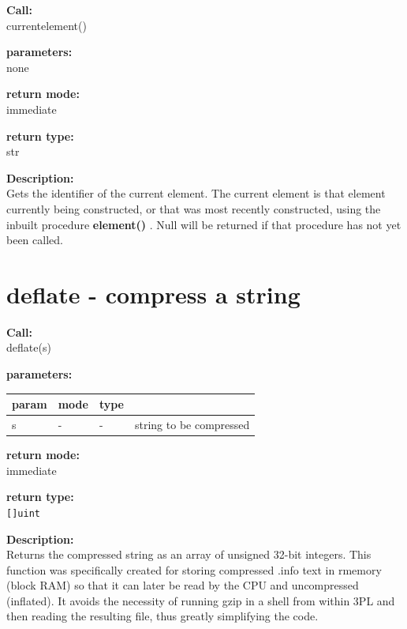         {\bf Call:} \\
        currentelement()
        
        {\bf parameters:} \\
        none
        
        {\bf return mode:} \\
        immediate

        {\bf return type:} \\
        str
        
        {\bf Description:} \\
        Gets the identifier of the current element. The current element is that
        element currently being constructed, or that was most recently
        constructed, using the inbuilt procedure  {\bf element()}
        . Null will be returned if that procedure has
        not yet been called.


    \section{deflate - compress a string}\label{sec:ifdeflate}
        
        {\bf Call:} \\
        deflate(s)
        
        {\bf parameters:} \\
        \begin{tabular}{| l | l | l | l |}
        \hline
        param  & mode & type & \\
        \hline \hline
        s & - & -   & string to be compressed \\ \hline
        \end{tabular}
        
        {\bf return mode:} \\
        immediate

        {\bf return type:} \\
        \verb'[]uint'
        
        {\bf Description:} \\
        Returns the compressed string as an array of unsigned 32-bit integers.
        This function was specifically created for storing compressed .info text
        in rmemory (block RAM) so that it can later be read by the CPU and
        uncompressed (inflated). It avoids the necessity of running gzip in a
        shell from within 3PL and then reading the resulting file, thus greatly
        simplifying the code.


